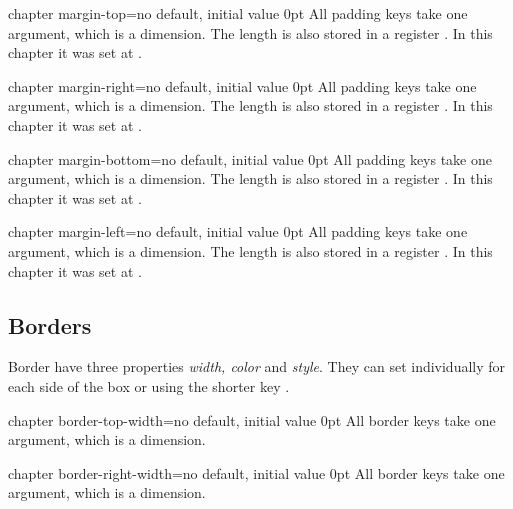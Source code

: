
\begin{docKey}[]{chapter margin-top}{=}{no default, initial value 0pt}
All padding keys take one argument, which is a dimension. The length is also stored in a register
\cmd{\chaptermargintop}. In this chapter it was set at .
\end{docKey}

\begin{docKey}[]{chapter margin-right}{=}{no default, initial value 0pt}
All padding keys take one argument, which is a dimension. The length is also stored in a register
\cmd{\chapterpaddingright}.  In this chapter it was set at \the\chapterpaddingright.
\end{docKey}

\begin{docKey}[]{chapter margin-bottom}{=}{no default, initial value 0pt}
All padding keys take one argument, which is a dimension. The length is also stored in a register
\cmd{\chapterpaddingbottom}.  In this chapter it was set at \the\chapterpaddingbottom.
\end{docKey}

\begin{docKey}[]{chapter margin-left}{=}{no default, initial value 0pt}
All padding keys take one argument, which is a dimension. The length is also stored in a register
\cmd{\chaptermarginleft}.  In this chapter it was set at \the\chaptermarginleft.
\end{docKey}

\subsection{Borders}

Border have three properties \emph{width, color} and \emph{style}. They can set individually for
each side of the box or using the shorter key .

\begin{docKey}[]{chapter border-top-width}{=}{no default, initial value 0pt}
All border keys take one argument, which is a dimension.
\end{docKey}

\begin{docKey}[]{chapter border-right-width}{=}{no default, initial value 0pt}
All border keys take one argument, which is a dimension.
\end{docKey}

